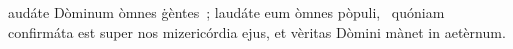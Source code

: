 \psalmChapterWithInscription{}
{ }
{%
audáte Dòminum òmnes ġèntes~; laudáte eum òmnes pòpuli, 
~quóniam confirmáta est super nos mizericórdia ejus, et vèritas Dòmini mànet in aetèrnum. 
}
